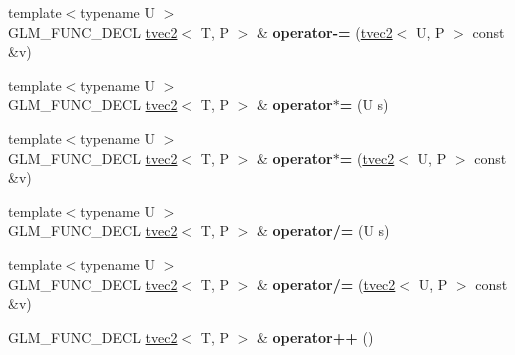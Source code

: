 \begin{DoxyCompactItemize}
\item 
\hypertarget{structglm_1_1detail_1_1tvec2_a9ab59a567b117ba933525ca8acec41cb}{{\footnotesize template$<$typename U $>$ }\\G\-L\-M\-\_\-\-F\-U\-N\-C\-\_\-\-D\-E\-C\-L \hyperlink{structglm_1_1detail_1_1tvec2}{tvec2}$<$ T, P $>$ \& {\bfseries operator-\/=} (\hyperlink{structglm_1_1detail_1_1tvec2}{tvec2}$<$ U, P $>$ const \&v)}\label{structglm_1_1detail_1_1tvec2_a9ab59a567b117ba933525ca8acec41cb}

\item 
\hypertarget{structglm_1_1detail_1_1tvec2_a8fa08d83addcb4ba1f57efc4be5644cc}{{\footnotesize template$<$typename U $>$ }\\G\-L\-M\-\_\-\-F\-U\-N\-C\-\_\-\-D\-E\-C\-L \hyperlink{structglm_1_1detail_1_1tvec2}{tvec2}$<$ T, P $>$ \& {\bfseries operator$\ast$=} (U s)}\label{structglm_1_1detail_1_1tvec2_a8fa08d83addcb4ba1f57efc4be5644cc}

\item 
\hypertarget{structglm_1_1detail_1_1tvec2_a37dcc7e738554b854e6c2352cd83a567}{{\footnotesize template$<$typename U $>$ }\\G\-L\-M\-\_\-\-F\-U\-N\-C\-\_\-\-D\-E\-C\-L \hyperlink{structglm_1_1detail_1_1tvec2}{tvec2}$<$ T, P $>$ \& {\bfseries operator$\ast$=} (\hyperlink{structglm_1_1detail_1_1tvec2}{tvec2}$<$ U, P $>$ const \&v)}\label{structglm_1_1detail_1_1tvec2_a37dcc7e738554b854e6c2352cd83a567}

\item 
\hypertarget{structglm_1_1detail_1_1tvec2_af6469124c24ce8b406467d7f006f388d}{{\footnotesize template$<$typename U $>$ }\\G\-L\-M\-\_\-\-F\-U\-N\-C\-\_\-\-D\-E\-C\-L \hyperlink{structglm_1_1detail_1_1tvec2}{tvec2}$<$ T, P $>$ \& {\bfseries operator/=} (U s)}\label{structglm_1_1detail_1_1tvec2_af6469124c24ce8b406467d7f006f388d}

\item 
\hypertarget{structglm_1_1detail_1_1tvec2_ad98620351ffef7d39ec7111a6be108ce}{{\footnotesize template$<$typename U $>$ }\\G\-L\-M\-\_\-\-F\-U\-N\-C\-\_\-\-D\-E\-C\-L \hyperlink{structglm_1_1detail_1_1tvec2}{tvec2}$<$ T, P $>$ \& {\bfseries operator/=} (\hyperlink{structglm_1_1detail_1_1tvec2}{tvec2}$<$ U, P $>$ const \&v)}\label{structglm_1_1detail_1_1tvec2_ad98620351ffef7d39ec7111a6be108ce}

\item 
\hypertarget{structglm_1_1detail_1_1tvec2_a9678bb2f72ed6a99f99ada6aab54a0ad}{G\-L\-M\-\_\-\-F\-U\-N\-C\-\_\-\-D\-E\-C\-L \hyperlink{structglm_1_1detail_1_1tvec2}{tvec2}$<$ T, P $>$ \& {\bfseries operator++} ()}\label{structglm_1_1detail_1_1tvec2_a9678bb2f72ed6a99f99ada6aab54a0ad}


\end{DoxyCompactItemize}
